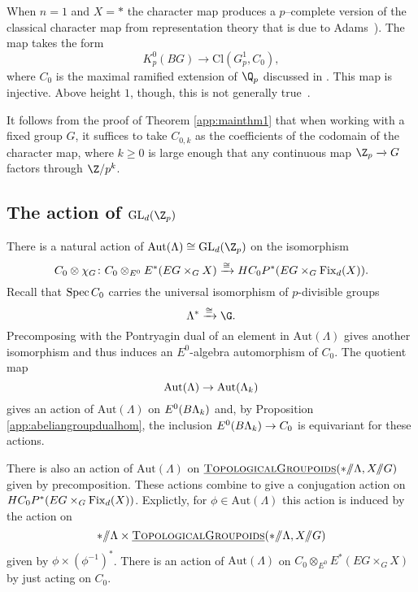 


\begin{example}
When $n=1$ and $X = *$ the character map produces a $p$--complete version of the classical character map from representation theory that is due to Adams~\cite[Section 2]{AdamsClassifyingSpacesII}). The map takes the form
\[
K_{p}^{0}(BG) \xrightarrow{} \mathrm{Cl}(G_{p}^{1}, C_0),
\]
where $C_0$ is the maximal ramified extension of $\Q_p$ discussed in . This map is injective. Above height $1$, though, this is not generally true~\cite{Kriz}.
\end{example}

\begin{remark}
It follows from the proof of Theorem \ref{app:mainthm1} that when working with a fixed group $G$, it suffices to take $C_{0,k}$ as the coefficients of the codomain of the character map, where $k \geq 0$ is large enough that any continuous map $\Z_p \xrightarrow{} G$ factors through $\Z/p^k$.
\end{remark}

\subsection{The action of $\mathrm{GL}_d(\Z_p)$}

There is a natural action of $\mathrm{Aut}(\Lambda) \cong \mathrm{GL}_d(\Z_p)$ on the isomorphism
\[
C_0 \otimes \chi_G \colon C_0 \otimes_{E^0} E^*(EG \times_G X) \xrightarrow{\cong} HC_{0}P^{*}(EG \times_G \operatorname{Fix}_d(X)).
\]
Recall that $\operatorname{Spec} C_0$ carries the universal isomorphism of $p$-divisible groups
\[
\Lambda^* \xrightarrow{\cong} \G.
\]
Precomposing with the Pontryagin dual of an element in $\mathrm{Aut}(\Lambda)$ gives another isomorphism and thus induces an $E^0$-algebra automorphism of $C_0$. The quotient map
\[
\mathrm{Aut}(\Lambda) \to \mathrm{Aut}(\Lambda_k)
\]  
gives an action of $\mathrm{Aut}(\Lambda)$ on $E^0(B\Lambda_k)$ and, by Proposition \ref{app:abeliangroupdualhom}, the inclusion $E^0(B\Lambda_k) \to C_0$ is equivariant for these actions.

There is also an action of $\mathrm{Aut}(\Lambda)$ on $\operatorname{\underline{\smash{\normalfont\textsc{TopologicalGroupoids}}}}(* /\!\!/ \Lambda, X /\!\!/ G)$ given by precomposition. These actions combine to give a conjugation action on $HC_{0}P^{*}(EG \times_G \operatorname{Fix}_d(X))$. Explictly, for $\phi \in \mathrm{Aut}(\Lambda)$ this action is induced by the action on 
\[
* /\!\!/ \Lambda \times \operatorname{\underline{\smash{\normalfont\textsc{TopologicalGroupoids}}}}(* /\!\!/ \Lambda, X /\!\!/ G)
\]
given by $\phi \times (\phi^{-1})^*$. There is an action of $\mathrm{Aut}(\Lambda)$ on $C_0 \otimes_{E^0} E^*(EG \times_G X)$ by just acting on $C_0$.



